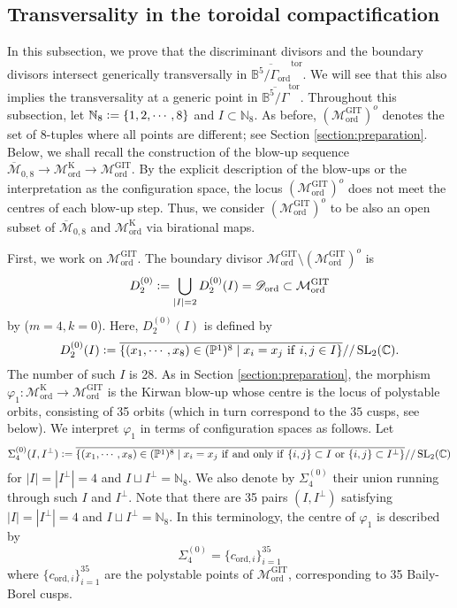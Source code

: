 \documentclass[12pt, pdftex]{amsart}
\theoremstyle{plain}
\theoremstyle{definition}
\numberwithin{equation}{section}
\def\C{{\mathbb C}}
\def\P{{\mathbb P}}
\def\B{{\mathbb B}}
\def\SL{\mathop{\mathrm{SL}}\nolimits}
\def\ord{\mathrm{ord}}
\def\GIT{\mathrm{GIT}}
\def\K{\mathrm{K}}
\def\tor{\mathrm{tor}}
\def\M{\mathcal{M}}
\def\D{\mathscr{D}}
\newcommand{\defeq}{\vcentcolon=}
\begin{document}
\subsection{Transversality in the toroidal compactification}
\label{transversality}
In this subsection, we prove that the discriminant divisors and the boundary divisors intersect generically transversally in $\overline{\B^5/\Gamma_{\ord}}^{\tor}$.
We will see that this also implies the transversality at a generic point in $\overline{\B^5/\Gamma}^{\tor}$.
Throughout this subsection, let $\mathbb{N}_8\defeq\{1,2,\cdots,8\}$ and $I\subset\mathbb{N}_8$.
As before, $(\M_{\ord}^{\GIT})^o$ denotes the set of $8$-tuples where all points are different; see Section \ref{section:preparation}.
Below, we shall recall the construction of the blow-up sequence $\overline{\M}_{0,8}\to\M_{\ord}^{\K}\to\M_{\ord}^{\GIT}$.
By the explicit description of the blow-ups or the interpretation as the configuration space, the locus $(\M_{\ord}^{\GIT})^o$ does not meet the centres of each blow-up step.
Thus, we consider $(\M_{\ord}^{\GIT})^o$ to be also an open subset of $\overline{\M}_{0,8}$ and $\M_{\ord}^{\K}$ via birational maps.


First, we work on $\M^{\GIT}_{\ord}$.
The boundary divisor  $\M^{\GIT}_{\ord}\setminus (\M_{\ord}^{\GIT})^o$ is 
\[D^{(0)}_2\defeq\bigcup_{|I|=2}D_2^{(0)}(I)=\D_{\ord}\subset\M_{\ord}^{\GIT}\]
by \cite[p1134]{KM11} ($m=4, k=0$).
Here, $D_2^{(0)}(I)$ is defined by
\[D_2^{(0)}(I)\defeq\overline{\left\{(x_1,\cdots,x_8)\in (\P^1)^8\mid x_i=x_j\ \mathrm{if}\ i,j\in I  \right\}}//\SL_2(\C).\]
The number of such $I$ is 28.
As in Section \ref{section:preparation}, the morphism $\varphi_1:\M_{\ord}^{\K}\to\M_{\ord}^{\GIT}$ is the Kirwan blow-up whose centre is the locus of polystable orbits, consisting of 35 orbits (which in turn 
correspond to the $35$ cusps, see below).
We interpret $\varphi_1$ in terms of configuration spaces as follows.
Let 
\[\Sigma_4^{(0)}(I,I^{\perp})\defeq\overline{\left\{(x_1,\cdots,x_8)\in (\P^1)^8 \mid x_i=x_j\ \mathrm{if\ and\ only\ if}\ \{i,j\}\subset I\ \mathrm{or}\ \{i,j\}\subset I^{\perp} \right\}}//\SL_2(\C)\]
for $|I|=|I^{\perp}|=4$ and $I\sqcup I^{\perp}=\mathbb{N}_8$.
We also denote by $\Sigma_4^{(0)}$ their union running through such $I$ and $I^{\perp}$.
Note that there are 35 pairs $(I,I^{\perp})$ satisfying $|I|=|I^{\perp}|=4$ and $I\sqcup I^{\perp}=\mathbb{N}_8$.
In this terminology, the centre of $\varphi_1$ is described by
\[\Sigma_4^{(0)}=\{c_{\ord,i}\}_{i=1}^{35}\]
where $\{c_{\ord,i}\}_{i=1}^{35}$ are the polystable points of $\M^{\GIT}_{\ord}$, corresponding to 35 Baily-Borel cusps.
\end{document}
